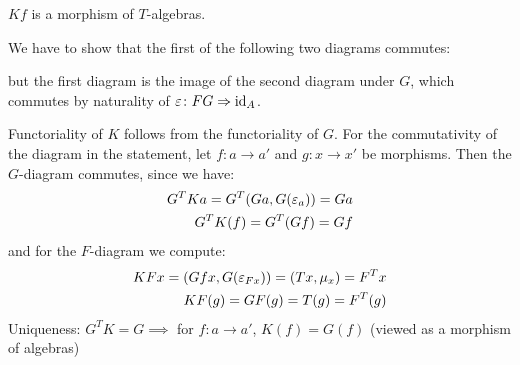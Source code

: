 \begin{beweis}
    \begin{claim*}
        $Kf$ is a morphism of $T$-algebras.
    \end{claim*}
    \begin{smallproof}
        We have to show that the first of the following two diagrams commutes:
        \begin{figure}[H]
        \centering
        \begin{subfigure}{0.4\textwidth}
        \centering
        \end{subfigure}
        \hspace{2em}
        \begin{subfigure}{0.4\textwidth}
        \centering
        \end{subfigure}
        \end{figure}
        but the first diagram is the image of the second diagram under $G$,
        which commutes by naturality of $\varepsilon \colon FG \Rightarrow \operatorname{id}_A$.
    \end{smallproof}
    Functoriality of $K$ follows from the functoriality of $G$.
    For the commutativity of the diagram in the statement, let $f \colon a \to a'$ and $g \colon x \to x'$ 
    be morphisms. Then the $G$-diagram commutes, since we have:
    \begin{align*}
        G^TKa = G^T(Ga,G(\varepsilon_a)) = Ga \\
        G^TK(f) = G^T(Gf) = Gf
    \end{align*}
    and for the $F$-diagram we compute:
    \begin{align*}
        KFx = (Gfx,G(\varepsilon_{Fx})) = (Tx,\mu_x) = F^Tx \\
        KF(g) = GF(g) = T(g) = F^T(g)
    \end{align*}
    Uniqueness: $G^TK = G \implies$ for $f \colon a \to a'$, $K(f) = G(f)$ (viewed as a morphism of algebras)

\end{beweis}
